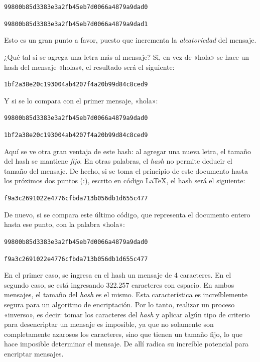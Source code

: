 \documentclass[12pt,a4paper,twoside]{book}
\begin{document}
\begin{center}
\texttt{99800b85d3383e3a2fb45eb7d0066a4879a9dad0}

\texttt{99800b85d3383e3a2fb45eb7d0066a4879a9dad1}
\end{center}

Esto es un gran punto a favor, puesto que incrementa la \textit{aleatoriedad} del mensaje.

¿Qué tal si se agrega una letra más al mensaje? Si, en vez de «hola» se hace un hash del mensaje «holas», el resultado será el siguiente:

\begin{center}
\texttt{1bf2a38e20c193004ab4207f4a20b99d84c8ced9}
\end{center}

Y si se lo compara con el primer mensaje, «hola»:

\begin{center}
\texttt{99800b85d3383e3a2fb45eb7d0066a4879a9dad0}

\texttt{1bf2a38e20c193004ab4207f4a20b99d84c8ced9}
\end{center}

Aquí se ve otra gran ventaja de este hash: al agregar una nueva letra, el tamaño del hash se mantiene \textit{fijo}. En otras palabras, el \textit{hash} no permite deducir el tamaño del mensaje. De hecho, si se toma el principio de este documento hasta los próximos dos puntos (:), escrito en código LaTeX, el hash será el siguiente:

\begin{center}
\texttt{f9a3c2691022e4776cfbda713b056db1d655c477}
\end{center}

De nuevo, si se compara este último código, que representa el documento entero hasta ese punto, con la palabra «hola»:

\begin{center}
\texttt{99800b85d3383e3a2fb45eb7d0066a4879a9dad0}

\texttt{f9a3c2691022e4776cfbda713b056db1d655c477}
\end{center}

En el primer caso, se ingresa en el hash un mensaje de 4 caracteres. En el segundo caso, se está ingresando 322.257 caracteres con espacio. En ambos mensajes, el tamaño del \textit{hash} es el mismo. Esta característica es increíblemente segura para un algoritmo de encriptación. Por lo tanto, realizar un proceso «inverso», es decir: tomar los caracteres del \textit{hash} y aplicar algún tipo de criterio para desencriptar un mensaje es imposible, ya que no solamente son completamente azarosos los caracteres, sino que tienen un tamaño fijo, lo que hace imposible determinar el mensaje. De allí radica su increíble potencial para encriptar mensajes.
\end{document}
